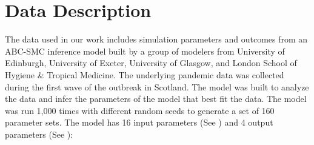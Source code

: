 \section{Data Description}
\label{sec:Data}

The data used in our work includes simulation parameters and outcomes from an ABC-SMC inference model \cite{toni2008Approximate} built by a group of modelers from University of Edinburgh, University of Exeter, University of Glasgow, and London School of Hygiene \& Tropical Medicine. The underlying pandemic data was collected during the first wave of the outbreak in Scotland. The model was built to analyze the data and infer the parameters of the model that best fit the data. The model was run 1,000 times with different random seeds to generate a set of 160 parameter sets. The model has 16 input parameters (See ) and 4 output parameters (See ):

